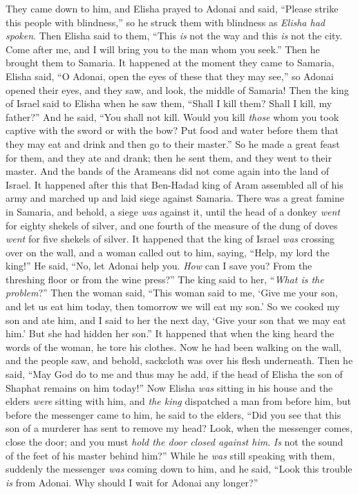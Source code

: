 \begin{biblechapter}
\verse They came down to him, and Elisha prayed to Adonai and said, “Please strike this people with blindness,” so he struck them with blindness as \textit{Elisha had spoken}.
\verse Then Elisha said to them, “This \textit{is} not the way and this \textit{is} not the city. Come after me, and I will bring you to the man whom you seek.” Then he brought them to Samaria.
\verse It happened at the moment they came to Samaria, Elisha said, “O Adonai, open the eyes of these that they may see,” so Adonai opened their eyes, and they saw, and look, the middle of Samaria!
\verse Then the king of Israel said to Elisha when he saw them, “Shall I kill them? Shall I kill, my father?”
\verse And he said, “You shall not kill. Would you kill \textit{those} whom you took captive with the sword or with the bow? Put food and water before them that they may eat and drink and then go to their master.”
\verse So he made a great feast for them, and they ate and drank; then he sent them, and they went to their master. And the bands of the Arameans did not come again into the land of Israel.
 It happened after this that Ben-Hadad king of Aram assembled all of his army and marched up and laid siege against Samaria.
\verse There was a great famine in Samaria, and behold, a siege \textit{was} against it, until the head of a donkey \textit{went} for eighty shekels of silver, and one fourth of the measure of the dung of doves \textit{went} for five shekels of silver.
\verse It happened that the king of Israel \textit{was} crossing over on the wall, and a woman called out to him, saying, “Help, my lord the king!”
\verse He said, “No, let Adonai help you. \textit{How} can I save you? From the threshing floor or from the wine press?”
\verse The king said to her, “\textit{What is the problem}?” Then the woman said, “This woman said to me, ‘Give me your son, and let us eat him today, then tomorrow we will eat my son.’
\verse So we cooked my son and ate him, and I said to her the next day, ‘Give your son that we may eat him.’ But she had hidden her son.”
\verse It happened that when the king heard the words of the woman, he tore his clothes. Now he had been walking on the wall, and the people saw, and behold, sackcloth was over his flesh underneath.
\verse Then he said, “May God do to me and thus may he add, if the head of Elisha the son of Shaphat remains on him today!”
\verse Now Elisha \textit{was} sitting in his house and the elders \textit{were} sitting with him, and \textit{the king} dispatched a man from before him, but before the messenger came to him, he said to the elders, “Did you see that this son of a murderer has sent to remove my head? Look, when the messenger comes, close the door; and you must \textit{hold the door closed against him}. \textit{Is} not the sound of the feet of his master behind him?”
\verse While he \textit{was} still speaking with them, suddenly the messenger \textit{was} coming down to him, and he said, “Look this trouble \textit{is} from Adonai. Why should I wait for Adonai any longer?”
\end{biblechapter}

